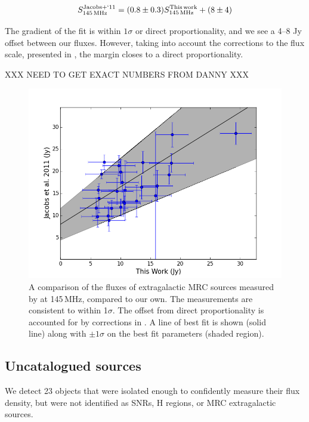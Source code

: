 \documentclass[useAMS,usenatbib]{mn2e}
\begin{document}
\begin{equation}
S_{145\,\rm{MHz}}^{\rm{Jacobs+`11}} = (0.8\pm0.3) S_{145\,\rm{MHz}}^{\rm{This\,work}} + (8\pm4)
\label{eq:PScal}
\end{equation}

The gradient of the fit is within $1\sigma$ or direct proportionality, and we see a 4--8 Jy offset between our fluxes. However, taking into account the corrections to the \cite{Jacobs.11} flux scale, presented in \cite[][see Section 3 of their paper]{Jacobs.13}, the margin closes to a direct proportionality. 

XXX NEED TO GET EXACT NUMBERS FROM DANNY XXX

\begin{figure}
\includegraphics[width=\columnwidth]{figs/Jacobs_Comparison.png}
\caption{A comparison of the fluxes of extragalactic MRC sources measured by \protect\cite{Jacobs.11} at 145\,MHz, compared to our own. The measurements are consistent to within 1$\sigma$. The offset from direct proportionality is accounted for by corrections in \protect\cite[][see Section 3 of their paper]{Jacobs.13}.  A line of best fit is shown (solid line) along with $\pm1\sigma$ on the best fit parameters (shaded region).}
\label{fig:exgal}
\end{figure}

\subsection{Uncatalogued sources}

We detect 23 objects that were isolated enough to confidently measure their flux density, but were not identified as SNRs, {H} regions, or MRC extragalactic sources.
\end{document}
